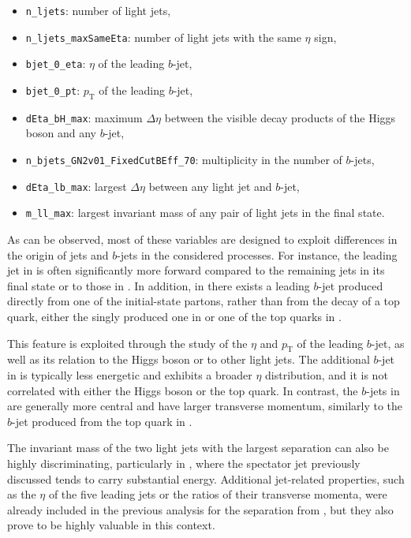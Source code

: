 \begin{itemize}
  \item \texttt{n\_ljets}: number of light jets,
  \item \texttt{n\_ljets\_maxSameEta}: number of light jets with the same $\eta$ sign,
  \item \texttt{bjet\_0\_eta}: $\eta$ of the leading $b$-jet,
  \item \texttt{bjet\_0\_pt}: $p_{\mathrm{T}}$ of the leading $b$-jet,
  \item \texttt{dEta\_bH\_max}: maximum $\Delta \eta$ between the visible decay products of the Higgs boson and any $b$-jet,
  \item \texttt{n\_bjets\_GN2v01\_FixedCutBEff\_70}: multiplicity in the number of $b$-jets,
  \item \texttt{dEta\_lb\_max}: largest $\Delta \eta$ between any light jet and $b$-jet,
  \item \texttt{m\_ll\_max}: largest invariant mass of any pair of light jets in the final state.
\end{itemize}

As can be observed, most of these variables are designed to exploit differences in the origin of jets and $b$-jets in the considered processes.
For instance, the leading jet in \thqb is often significantly more forward compared to the remaining jets in its final state or to those in \ttH. In addition, in \thqb there exists a leading $b$-jet produced directly from one of the initial-state partons, rather than from the decay of a top quark, either the singly produced one in \thqb or one of the top quarks in \ttH.

This feature is exploited through the study of the $\eta$ and $p_{\mathrm{T}}$ of the leading $b$-jet, as well as its relation to the Higgs boson or to other light jets. The additional $b$-jet in \thqb is typically less energetic and exhibits a broader $\eta$ distribution, and it is not correlated with either the Higgs boson or the top quark. In contrast, the $b$-jets in \ttH are generally more central and have larger transverse momentum, similarly to the $b$-jet produced from the top quark in \thqb.

The invariant mass of the two light jets with the largest separation can also be highly discriminating, particularly in \thqb, where the spectator jet previously discussed tends to carry substantial energy. Additional jet-related properties, such as the $\eta$ of the five leading jets or the ratios of their transverse momenta, were already included in the previous analysis for the separation from \ztautau, but they also prove to be highly valuable in this context.

